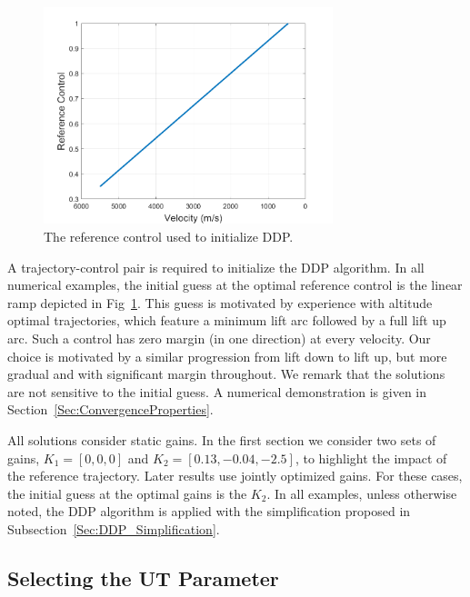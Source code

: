 \begin{figure}[h!]
	\centering
	\includegraphics[width=0.75\textwidth]{Images/GuessControl}
	\caption{The reference control used to initialize DDP.}
	\label{Fig:GuessControl}
\end{figure}
A trajectory-control pair is required to initialize the DDP algorithm. In all numerical examples, the initial guess at the optimal reference control is the linear ramp depicted in Fig~\ref{Fig:GuessControl}. This guess is motivated by experience with altitude optimal trajectories, which feature a minimum lift arc followed by a full lift up arc. Such a control has zero margin (in one direction) at every velocity. Our choice is motivated by a similar progression from lift down to lift up, but more gradual and with significant margin throughout. We remark that the solutions are not sensitive to the initial guess. A numerical demonstration is given in Section~\ref{Sec:ConvergenceProperties}.

All solutions consider static gains. In the first section we consider two sets of gains, $K_1=[0,0,0]$ and $K_2 = [0.13,-0.04,-2.5]$, to highlight the impact of the reference trajectory. Later results use jointly optimized gains. For these cases, the initial guess at the optimal gains is the $K_2$. In all examples, unless otherwise noted, the DDP algorithm is applied with the simplification proposed in Subsection~\ref{Sec:DDP_Simplification}.

\subsection{Selecting the UT Parameter}

